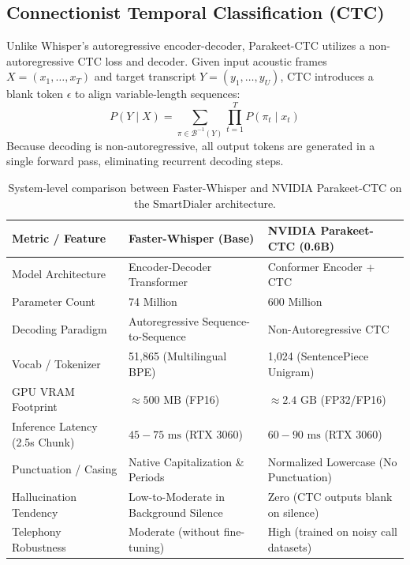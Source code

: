 \documentclass[11pt,a4paper,titlepage]{report}
\begin{document}
\subsection{Connectionist Temporal Classification (CTC)}
Unlike Whisper's autoregressive encoder-decoder, Parakeet-CTC utilizes a non-autoregressive CTC loss and decoder. Given input acoustic frames $X = (x_1, \dots, x_T)$ and target transcript $Y = (y_1, \dots, y_U)$, CTC introduces a blank token $\epsilon$ to align variable-length sequences:
\begin{equation}
    P(Y \mid X) = \sum_{\pi \in \mathcal{B}^{-1}(Y)} \prod_{t=1}^{T} P(\pi_t \mid x_t)
\end{equation}
Because decoding is non-autoregressive, all output tokens are generated in a single forward pass, eliminating recurrent decoding steps.

\begin{table}[h!]
\centering
\small
\begin{tabular}{@{}lll@{}}
\toprule
\textbf{Metric / Feature} & \textbf{Faster-Whisper (Base)} & \textbf{NVIDIA Parakeet-CTC (0.6B)} \\
\midrule
Model Architecture & Encoder-Decoder Transformer & Conformer Encoder + CTC \\
Parameter Count & 74 Million & 600 Million \\
Decoding Paradigm & Autoregressive Sequence-to-Sequence & Non-Autoregressive CTC \\
Vocab / Tokenizer & 51,865 (Multilingual BPE) & 1,024 (SentencePiece Unigram) \\
GPU VRAM Footprint & $\approx 500\text{ MB}$ (FP16) & $\approx 2.4\text{ GB}$ (FP32/FP16) \\
Inference Latency (2.5s Chunk) & $45 - 75\text{ ms}$ (RTX 3060) & $60 - 90\text{ ms}$ (RTX 3060) \\
Punctuation / Casing & Native Capitalization \& Periods & Normalized Lowercase (No Punctuation) \\
Hallucination Tendency & Low-to-Moderate in Background Silence & Zero (CTC outputs blank on silence) \\
Telephony Robustness & Moderate (without fine-tuning) & High (trained on noisy call datasets) \\
\bottomrule
\end{tabular}
\caption{System-level comparison between Faster-Whisper and NVIDIA Parakeet-CTC on the SmartDialer architecture.}
\label{tab:asr_comparison}
\end{table}
\end{document}
